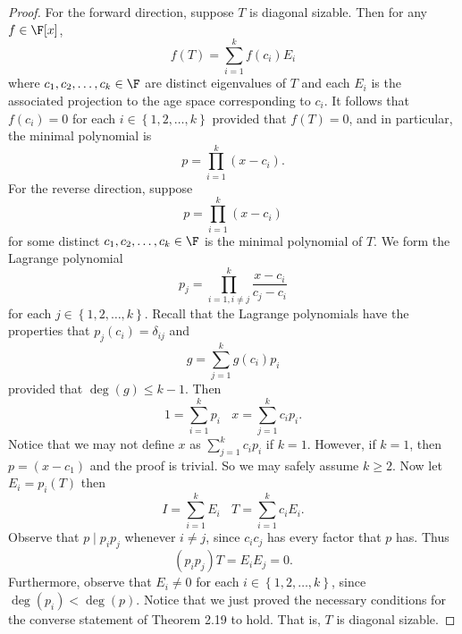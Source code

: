 \documentclass[linearalgebraII]{subfiles}
\begin{document}
    \begin{proof}
        For the forward direction, suppose $T$ is diagonal sizable. Then for any $f\in \F[x]$,
        \begin{equation*}
            f(T) = \sum^{k}_{i=1} f(c_i)E_i
        \end{equation*}
        where $c_1, c_2, \ldots, c_k\in \F$ are distinct eigenvalues of $T$ and each $E_i$ is the associated projection to the age space corresponding to $c_i$. It follows that $f(c_i) = 0$ for each $i\in \left\lbrace 1, 2, \ldots, k \right\rbrace$ provided that $f(T) = 0$, and in particular, the minimal polynomial is
        \begin{equation*}
            p = \prod^{k}_{i=1} (x-c_i).
        \end{equation*}
        For the reverse direction, suppose
        \begin{equation*}
            p = \prod^{k}_{i=1} (x-c_i)
        \end{equation*}
        for some distinct $c_1, c_2, \ldots, c_k\in \F$ is the minimal polynomial of $T$. We form the Lagrange polynomial
        \begin{equation*}
            p_j = \prod^{k}_{i=1,i\neq j} \frac{x-c_i}{c_j-c_i}
        \end{equation*}
        for each $j\in \left\lbrace 1, 2, \ldots, k \right\rbrace$. Recall that the Lagrange polynomials have the properties that $p_j(c_i) = \delta_{ij}$ and
        \begin{equation*}
            g = \sum^{k}_{j=1} g(c_i)p_i
        \end{equation*}
        provided that $\deg(g)\leq k-1$. Then
        \begin{equation*}
            1 = \sum^{k}_{i=1} p_i \ \ \ \ x = \sum^{k}_{j=1} c_ip_i.
        \end{equation*}
        Notice that we may not define $x$ as $\sum^{k}_{j=1} c_ip_i$ if $k = 1$. However, if $k=1$, then $p = (x-c_1)$ and the proof is trivial. So we may safely assume $k\geq 2$. Now let $E_i = p_i(T)$ then
        \begin{equation*}
            I = \sum^{k}_{i=1} E_i \ \ \ \ T = \sum^{k}_{i=1} c_iE_i.
        \end{equation*}
        Observe that $p\mid p_ip_j$ whenever $i\neq j$, since $c_ic_j$ has every factor that $p$ has. Thus
        \begin{equation*}
            \left( p_ip_j \right)T = E_iE_j = 0.
        \end{equation*}
        Furthermore, observe that $E_i\neq 0$ for each $i\in \left\lbrace 1, 2, \ldots, k \right\rbrace$, since $\deg(p_i) < \deg(p)$. Notice that we just proved the necessary conditions for the converse statement of Theorem 2.19 to hold. That is, $T$ is diagonal sizable.
    \end{proof}
\end{document}
